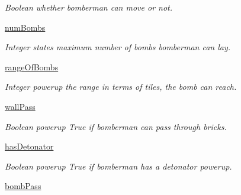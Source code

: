 \begin{DoxyCompactItemize}
\begin{DoxyCompactList}\small\item\em Boolean whether bomberman can move or not. \end{DoxyCompactList}\item 
\hypertarget{classsrc_1_1bomberman_1_1_bomberman_a2cb3572c62ccccb8eb2383145d0d4f2e}{}\hyperlink{classsrc_1_1bomberman_1_1_bomberman_a2cb3572c62ccccb8eb2383145d0d4f2e}{num\+Bombs}\label{classsrc_1_1bomberman_1_1_bomberman_a2cb3572c62ccccb8eb2383145d0d4f2e}

\begin{DoxyCompactList}\small\item\em Integer states maximum number of bombs bomberman can lay. \end{DoxyCompactList}\item 
\hypertarget{classsrc_1_1bomberman_1_1_bomberman_a60e8708ab7b666aa01aeb3cf0660db92}{}\hyperlink{classsrc_1_1bomberman_1_1_bomberman_a60e8708ab7b666aa01aeb3cf0660db92}{range\+Of\+Bombs}\label{classsrc_1_1bomberman_1_1_bomberman_a60e8708ab7b666aa01aeb3cf0660db92}

\begin{DoxyCompactList}\small\item\em Integer powerup the range in terms of tiles, the bomb can reach. \end{DoxyCompactList}\item 
\hypertarget{classsrc_1_1bomberman_1_1_bomberman_a8f1c6898c8d82b94228c5d4361c389a4}{}\hyperlink{classsrc_1_1bomberman_1_1_bomberman_a8f1c6898c8d82b94228c5d4361c389a4}{wall\+Pass}\label{classsrc_1_1bomberman_1_1_bomberman_a8f1c6898c8d82b94228c5d4361c389a4}

\begin{DoxyCompactList}\small\item\em Boolean powerup True if bomberman can pass through bricks. \end{DoxyCompactList}\item 
\hypertarget{classsrc_1_1bomberman_1_1_bomberman_af3633e53e0443adbc59816892d516065}{}\hyperlink{classsrc_1_1bomberman_1_1_bomberman_af3633e53e0443adbc59816892d516065}{has\+Detonator}\label{classsrc_1_1bomberman_1_1_bomberman_af3633e53e0443adbc59816892d516065}

\begin{DoxyCompactList}\small\item\em Boolean powerup True if bomberman has a detonator powerup. \end{DoxyCompactList}\item 
\hypertarget{classsrc_1_1bomberman_1_1_bomberman_aca70e55b92691117f315e82d444188d4}{}\hyperlink{classsrc_1_1bomberman_1_1_bomberman_aca70e55b92691117f315e82d444188d4}{bomb\+Pass}\label{classsrc_1_1bomberman_1_1_bomberman_aca70e55b92691117f315e82d444188d4}


\end{DoxyCompactItemize}
